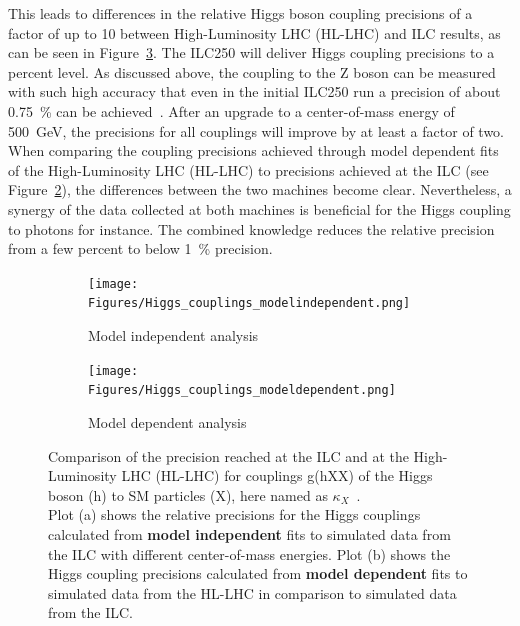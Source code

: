 This leads to differences in the relative Higgs boson coupling precisions of a factor of up to 10 between High-Luminosity LHC (HL-LHC) and ILC results, as can be seen in Figure~\ref{fig:Higgs_couplings}.
The ILC250 will deliver Higgs coupling precisions to a percent level.
As discussed above, the coupling to the Z boson can be measured with such high accuracy that even in the initial ILC250 run a precision of about \SI{0.75}{\percent} can be achieved~\cite[p. 6]{HiggsCouplings_Junping}.
After an upgrade to a center-of-mass energy of \SI{500}{\GeV}, the precisions for all couplings will improve by at least a factor of two.
When comparing the coupling precisions achieved through model dependent fits of the High-Luminosity LHC (HL-LHC) to precisions achieved at the ILC (see Figure~\ref{fig:Higgs_couplings_b}), the differences between the two machines become clear.
Nevertheless, a synergy of the data collected at both machines is beneficial for the Higgs coupling to photons for instance.
The combined knowledge reduces the relative precision from a few percent to below \SI{1}{\percent} precision.
 \begin{figure}[h]
 \centering
  \begin{subfigure}[b]{0.49\textwidth}
   \centering
    \texttt{[image: Figures/Higgs\_couplings\_modelindependent.png]}
   \caption{Model independent analysis}
   \label{fig:Higgs_couplings_a}
   \end{subfigure}
   \hfill
    \begin{subfigure}[b]{0.49\textwidth}
   \centering
    \texttt{[image: Figures/Higgs\_couplings\_modeldependent.png]}
   \caption{Model dependent analysis}
   \label{fig:Higgs_couplings_b}
   \end{subfigure}
   \caption[Higgs coupling precisions]{Comparison of the precision reached at the ILC and at the High-Luminosity LHC (HL-LHC) for couplings g(hXX) of the Higgs boson (h) to SM particles (X), here named as $\kappa_X$~\cite{HiggsCouplings_Junping}.\\
   Plot (a) shows the relative precisions for the Higgs couplings calculated from \textbf{model independent} fits to simulated data from the ILC with different center-of-mass energies.
   Plot (b) shows the Higgs coupling precisions calculated from \textbf{model dependent} fits to simulated data from the HL-LHC in comparison to simulated data from the ILC.}
   \label{fig:Higgs_couplings}
 \end{figure}
 
